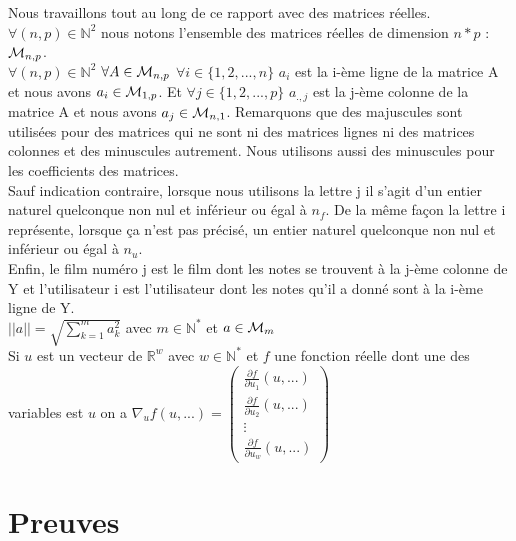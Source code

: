 \documentclass[a4paper,10pt]{article}
\begin{document}
Nous travaillons tout au long de ce rapport avec des matrices réelles. $\forall (n, p) \in \mathbb{N}^2$ nous notons l'ensemble des matrices réelles de dimension $n * p$ : ${\cal M}_{n, p}$.\\ 
$\forall (n, p) \in \mathbb{N}^2$ $\forall A \in {\cal M}_{n, p}$ $\forall i \in \{1, 2, ..., n\}$ $a_i$ est la i-ème ligne de la matrice A et nous avons $a_i \in {\cal M}_{1, p}$. Et $\forall j \in \{1, 2, ..., p\}$ $a_{., j}$ est la j-ème colonne de la matrice A et nous avons $a_j \in {\cal M}_{n, 1}$. Remarquons que des majuscules sont utilisées pour des matrices qui ne sont ni des matrices lignes ni des matrices colonnes et des minuscules autrement. Nous utilisons aussi des minuscules pour les coefficients des matrices.\\ 
Sauf indication contraire, lorsque nous utilisons la lettre j il s'agit d'un entier naturel quelconque non nul et inférieur ou égal à $n_f$. De la même façon la lettre i représente, lorsque ça n'est pas précisé, un entier naturel quelconque non nul et inférieur ou égal à $n_u$.\\ 
Enfin, le film numéro j est le film dont les notes se trouvent à la j-ème colonne de Y et l'utilisateur i est l'utilisateur dont les notes qu'il a donné sont à la i-ème ligne de Y.\\

$||a|| = \sqrt{\sum_{k = 1}^{m} a_{k}^{2}}$ avec $m \in \mathbb{N}^*$ et $a \in {\cal M}_{m}$\\

Si $u$ est un vecteur de $\mathbb{R}^w$ avec $w \in \mathbb{N}^*$ et $f$ une fonction réelle dont une des variables est $u$ on a 
$\nabla_{u} f(u, ...) =
\begin{pmatrix}
\frac{\partial f}{\partial u_{1}}(u, ...)\\
\frac{\partial f}{\partial u_{2}}(u, ...)\\
\vdots\\
\frac{\partial f}{\partial u_{w}}(u, ...)
\end{pmatrix}$

\newpage

\section{Preuves}
\end{document}
